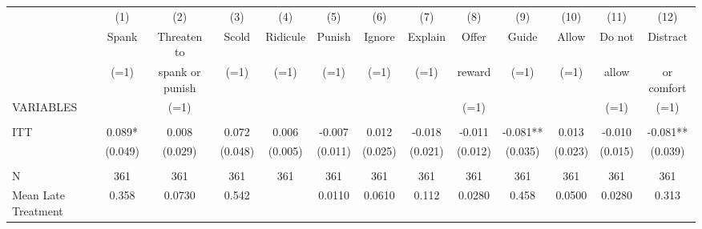 \begin{tabular}{lcccccccccccc} \hline
 & (1) & (2) & (3) & (4) & (5) & (6) & (7) & (8) & (9) & (10) & (11) & (12) \\
 & Spank & Threaten to & Scold & Ridicule & Punish & Ignore & Explain & Offer & Guide & Allow & Do not & Distract \\
 & (=1) & spank or punish & (=1) & (=1) & (=1) & (=1) & (=1) & reward & (=1) & (=1) & allow & or comfort \\
VARIABLES &  & (=1) &  &  &  &  &  & (=1) &  &  & (=1) & (=1) \\ \hline
 &  &  &  &  &  &  &  &  &  &  &  &  \\
ITT & 0.089* & 0.008 & 0.072 & 0.006 & -0.007 & 0.012 & -0.018 & -0.011 & -0.081** & 0.013 & -0.010 & -0.081** \\
 & (0.049) & (0.029) & (0.048) & (0.005) & (0.011) & (0.025) & (0.021) & (0.012) & (0.035) & (0.023) & (0.015) & (0.039) \\
 &  &  &  &  &  &  &  &  &  &  &  &  \\
N & 361 & 361 & 361 & 361 & 361 & 361 & 361 & 361 & 361 & 361 & 361 & 361 \\
 Mean Late Treatment & 0.358 & 0.0730 & 0.542 &  & 0.0110 & 0.0610 & 0.112 & 0.0280 & 0.458 & 0.0500 & 0.0280 & 0.313 \\ \hline
\end{tabular}

